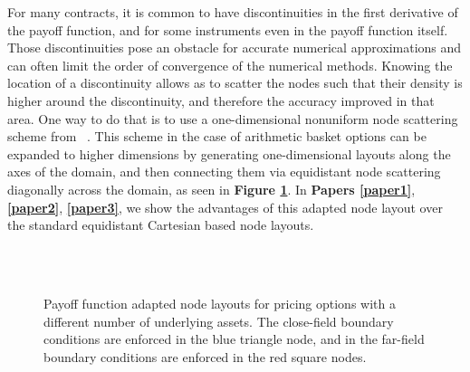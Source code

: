 \documentclass{UUThesisTemplate}
\begin{document}
\par
For many contracts, it is common to have discontinuities in the first derivative of the payoff function, and for some instruments even in the payoff function itself. Those discontinuities pose an obstacle for accurate numerical approximations and can often limit the order of convergence of the numerical methods. Knowing the location of a discontinuity allows as to scatter the nodes such that their density is higher around the discontinuity, and therefore the accuracy improved in that area. One way to do that is to use a one-dimensional nonuniform node scattering scheme from ~\cite{foulon2010adi}. This scheme in the case of arithmetic basket options can be expanded to higher dimensions by generating one-dimensional layouts along the axes of the domain, and then connecting them via equidistant node scattering diagonally across the domain, as seen in \textbf{Figure \ref{fig:gridadap}}. In \textbf{Papers \ref{paper1}}, \textbf{\ref{paper2}}, \textbf{\ref{paper3}}, we show the advantages of this adapted node layout over the standard equidistant Cartesian based node layouts.   

\begin{figure}[H]
\centering
\\
\vspace{11pt}
\\
\caption{Payoff function adapted node layouts for pricing options with a different number of underlying assets. The close-field boundary conditions are enforced in the blue triangle node, and in the far-field boundary conditions are enforced in the red square nodes.}
\label{fig:gridadap}
\end{figure}
\end{document}
